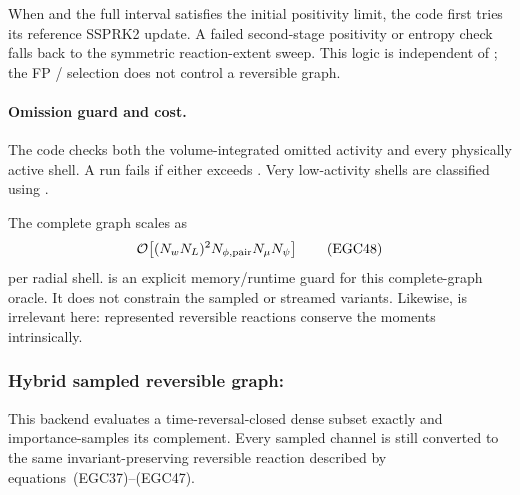 When  and the full interval
satisfies the initial positivity limit, the code first tries its reference
SSPRK2 update.  A failed second-stage positivity or entropy check falls back
to the symmetric reaction-extent sweep.  This logic is independent of
; the FP /
selection does not control a reversible graph.

\paragraph{Omission guard and cost.}
The code checks both the volume-integrated omitted activity and every
physically active shell.  A run fails if either exceeds
.  Very low-activity shells are
classified using .

The complete graph scales as
\[
 {\cal O}\!\left[(N_wN_L)^2
 N_{\phi,\rm pair}N_\mu N_\psi\right]                   \tag{EGC48}
\]
per radial shell.   is an explicit
memory/runtime guard for this complete-graph oracle.  It does not constrain
the sampled or streamed variants.  Likewise,
 is irrelevant here: represented
reversible reactions conserve the moments intrinsically.

\subsubsection[Hybrid sampled reversible graph]{
Hybrid sampled reversible graph:
}

This backend evaluates a time-reversal-closed dense subset exactly and
importance-samples its complement.  Every sampled channel is still converted
to the same invariant-preserving reversible reaction described by
equations~(EGC37)--(EGC47).

